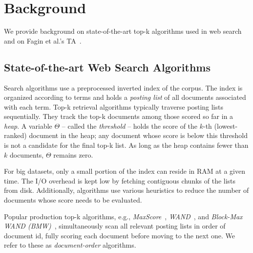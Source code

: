 
\section{Background}
\label{sec:background}

We provide background on state-of-the-art top-k algorithms used in web search and on Fagin et al.'s TA~\cite{Fagin:2003}.

\subsection{State-of-the-art Web Search Algorithms}

Search algorithms use a preprocessed inverted index of the corpus. The index is organized according to terms and holds a \emph{posting list} of all documents associated with each term. Top-k retrieval algorithms typically traverse  posting lists sequentially. %
	They track the top-k documents among those scored so far in a \emph{heap}. A variable $\Theta$ -- called the \emph{threshold} -- holds the score of the $k$-th (lowest-ranked) document in the heap;  any document whose score is below this threshold is not a candidate for the final top-k list. As long as the heap contains fewer than $k$ documents, $\Theta$ remains zero.

For big datasets, only a small portion of the index can reside in RAM at a given time. The I/O overhead is kept low by fetching contiguous chunks of the lists from disk. 
Additionally, algorithms use various heuristics to reduce the number of documents whose score needs to be evaluated. 

Popular production top-k algorithms, e.g., 
{\em MaxScore}~\cite{Strohman:2005,Turtle:1995}, {\em WAND}~\cite{Broder:2003}, and {\em Block-Max WAND (BMW)}~\cite{Ding:2011}, 
simultaneously scan all relevant posting lists in order of document id, fully scoring each document before moving to the next one. 
We  refer to these as \emph{document-order} algorithms. 



